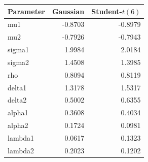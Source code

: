 \begin{tabular}{lrr}
\toprule
Parameter & Gaussian & Student-$t(6)$ \\
\midrule
mu1 & -0.8703 & -0.8979 \\
mu2 & -0.7926 & -0.7943 \\
sigma1 & 1.9984 & 2.0184 \\
sigma2 & 1.4508 & 1.3985 \\
rho & 0.8094 & 0.8119 \\
delta1 & 1.3178 & 1.5317 \\
delta2 & 0.5002 & 0.6355 \\
alpha1 & 0.3608 & 0.4034 \\
alpha2 & 0.1724 & 0.0981 \\
lambda1 & 0.0617 & 0.1323 \\
lambda2 & 0.2023 & 0.1202 \\
\bottomrule
\end{tabular}

